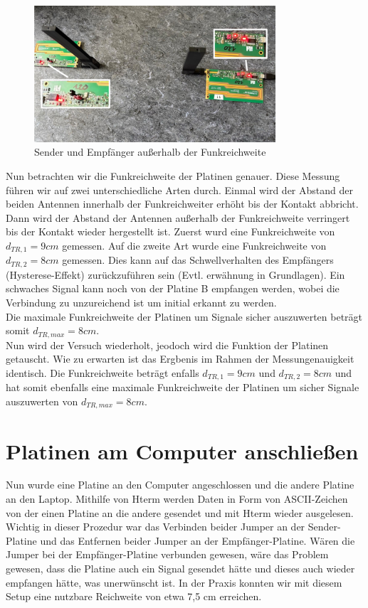 \begin{figure}[H]
    \centering
    \includegraphics[width=0.8\textwidth]{Pictures/Task2a.jpg}
    \caption{Sender und Empfänger außerhalb der Funkreichweite}
    \label{fig:Task2a}
\end{figure}
Nun betrachten wir die Funkreichweite der Platinen genauer. Diese Messung führen wir auf zwei unterschiedliche
Arten durch. Einmal wird der Abstand der beiden Antennen innerhalb der Funkreichweiter erhöht bis der Kontakt
abbricht. Dann wird der Abstand der Antennen außerhalb der Funkreichweite verringert bis der Kontakt wieder
hergestellt ist. Zuerst wurd eine Funkreichweite von $d_{TR,1}=9cm$ gemessen. Auf die zweite Art wurde eine
Funkreichweite von $d_{TR,2}=8cm$ gemessen. Dies kann auf das Schwellverhalten des Empfängers (Hysterese-Effekt)
zurückzuführen sein (Evtl. erwähnung in Grundlagen). 
Ein schwaches Signal kann noch von der Platine B empfangen werden, wobei die Verbindung zu unzureichend ist um 
initial erkannt zu werden.\\
Die maximale Funkreichweite der Platinen um Signale sicher auszuwerten beträgt somit $d_{TR,max}=8cm$.
\\
Nun wird der Versuch wiederholt, jeodoch wird die Funktion der Platinen getauscht. Wie zu erwarten ist das Ergbenis
im Rahmen der Messungenauigkeit identisch. Die Funkreichweite beträgt enfalls $d_{TR,1}=9cm$ und $d_{TR,2}=8cm$ und 
hat somit ebenfalls eine maximale Funkreichweite der Platinen um sicher Signale auszuwerten von $d_{TR,max}=8cm$.
\section{Platinen am Computer anschließen}
Nun wurde eine Platine an den Computer angeschlossen und die andere Platine an den Laptop.
Mithilfe von Hterm werden Daten in Form von ASCII-Zeichen von der einen Platine an die andere gesendet
und mit Hterm wieder ausgelesen.
Wichtig in dieser Prozedur war das Verbinden beider Jumper an der Sender-Platine und das Entfernen beider
Jumper an der Empfänger-Platine. 
Wären die Jumper bei der Empfänger-Platine verbunden gewesen, wäre das Problem gewesen, dass die Platine auch 
ein Signal gesendet hätte und dieses auch wieder empfangen hätte, was unerwünscht ist.
In der Praxis konnten wir mit diesem Setup eine nutzbare Reichweite von etwa 7,5 cm erreichen.

